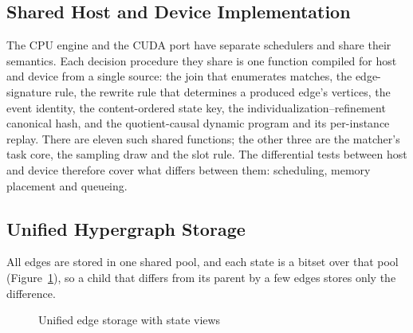 \subsection{Shared Host and Device Implementation}
\label{sec:shared-core}

The CPU engine and the CUDA port have separate schedulers and share their semantics. Each decision
procedure they share is one function compiled for host and device from a single source: the join
that enumerates matches, the edge-signature rule, the rewrite rule that determines a produced
edge's vertices, the event identity, the content-ordered state key, the individualization--refinement
canonical hash, and the quotient-causal dynamic program and its per-instance replay. There are
eleven such shared functions; the other three are the matcher's task core, the sampling draw and
the slot rule. The differential tests between host and device therefore cover what differs between
them: scheduling, memory placement and queueing.

\subsection{Unified Hypergraph Storage}
\label{sec:storage}

All edges are stored in one shared pool, and each state is a bitset over that pool
(Figure~\ref{fig:storage}), so a child that differs from its parent by a few edges stores only the
difference.

\begin{figure}[htbp]
\centering
{}
\caption{Unified edge storage with state views}
\label{fig:storage}
\end{figure}

